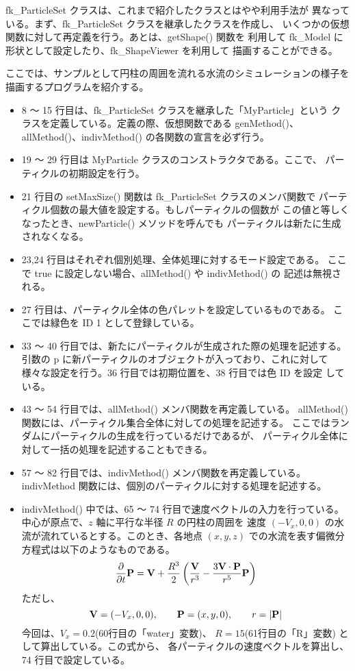 fk\_ParticleSet クラスは、これまで紹介したクラスとはやや利用手法が
異なっている。まず、fk\_ParticleSet クラスを継承したクラスを作成し、
いくつかの仮想関数に対して再定義を行う。あとは、getShape() 関数を
利用して fk\_Model に形状として設定したり、fk\_ShapeViewer を利用して
描画することができる。

ここでは、サンプルとして円柱の周囲を流れる水流のシミュレーションの様子を
描画するプログラムを紹介する。
\begin{itemize}
 \item 8 〜 15 行目は、fk\_ParticleSet クラスを継承した「MyParticle」という
	クラスを定義している。定義の際、仮想関数である genMethod()、
	allMethod()、indivMethod() の各関数の宣言を必ず行う。

 \item 19 〜 29 行目は MyParticle クラスのコンストラクタである。ここで、
	パーティクルの初期設定を行う。

 \item 21 行目の setMaxSize() 関数は fk\_ParticleSet クラスのメンバ関数で
	パーティクル個数の最大値を設定する。もしパーティクルの個数が
	この値と等しくなったとき、newParticle() メソッドを呼んでも
	パーティクルは新たに生成されなくなる。

 \item 23,24 行目はそれぞれ個別処理、全体処理に対するモード設定である。
	ここで true に設定しない場合、allMethod() や indivMethod() の
	記述は無視される。

 \item 27 行目は、パーティクル全体の色パレットを設定しているものである。
	ここでは緑色を ID 1 として登録している。

 \item 33 〜 40 行目では、新たにパーティクルが生成された際の処理を記述する。
	引数の p に新パーティクルのオブジェクトが入っており、これに対して
	様々な設定を行う。36 行目では初期位置を、38 行目では色 ID を設定
	している。

 \item 43 〜 54 行目では、allMethod() メンバ関数を再定義している。
	allMethod() 関数には、パーティクル集合全体に対しての処理を記述する。
	ここではランダムにパーティクルの生成を行っているだけであるが、
	パーティクル全体に対して一括の処理を記述することもできる。

 \item 57 〜 82 行目では、indivMethod() メンバ関数を再定義している。
	indivMethod 関数には、個別のパーティクルに対する処理を記述する。

 \item indivMethod() 中では、65 〜 74 行目で速度ベクトルの入力を行っている。
	中心が原点で、\(z\) 軸に平行な半径 \(R\) の円柱の周囲を
	速度 \((-V_x, 0, 0)\) の水流が流れているとする。このとき、各地点
	\((x, y, z)\) での水流を表す偏微分方程式は以下のようなものである。
	\[
		\frac{\partial}{\partial t}\mathbf{P} =
		\mathbf{V} + \frac{R^3}{2}
		\left(\frac{\mathbf{V}}{r^3} -
		\frac{3 \mathbf{V} \cdot \mathbf{P}}{r^5} \mathbf{P} \right)
	\]
	ただし、
	\[
		\mathbf{V} = (-V_x, 0, 0), \qquad
		\mathbf{P} = (x, y, 0), \qquad r = |\mathbf{P}|
	\]
	今回は、\(V_x = 0.2\)(60行目の「water」変数)、
	\(R = 15\)(61行目の「R」変数) として算出している。この式から、
	各パーティクルの速度ベクトルを算出し、74 行目で設定している。


\end{itemize}

